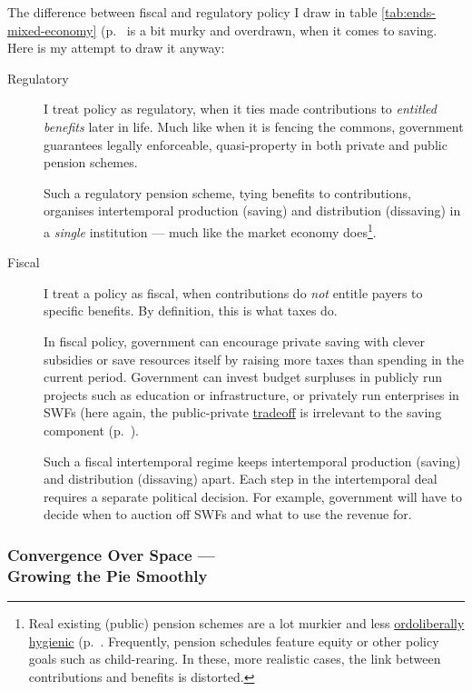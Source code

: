 The difference between fiscal and regulatory policy I draw in table \ref{tab:ends-mixed-economy} (p.~\pageref{tab:ends-mixed-economy} is a bit murky and overdrawn, when it comes to saving.  Here is my attempt to draw it anyway:
\begin{description}
	\item[Regulatory] I treat policy as regulatory, when it ties made contributions to \emph{entitled benefits} later in life. Much like when it is fencing the commons, government guarantees legally enforceable, quasi-property in both private and public pension schemes.

	Such a regulatory pension scheme, tying benefits to contributions, organises intertemporal production (saving) and distribution (dissaving) in a \emph{single} institution --- much like the market economy does\footnote{
		Real existing (public) pension schemes are a lot murkier and less \hyperref[sec:ordoliberalhygiene]{ordoliberally hygienic} (p.~\pageref{sec:ordoliberalhygiene}. Frequently, pension schedules feature equity or other policy goals such as child-rearing. In these, more realistic cases, the link between contributions and benefits is distorted.}.
	\item[Fiscal] I treat a policy as fiscal, when contributions do \emph{not} entitle payers to specific benefits. By definition, this is what taxes do.

	In fiscal policy, government can encourage private saving with clever subsidies or save resources itself by raising more taxes than spending in the current period. Government can invest budget surpluses in publicly run projects such as education or infrastructure, or privately run enterprises in \glspl{SWF} (here again, the public-private \hyperref[sec:tradeoffs]{tradeoff} is irrelevant to the saving component (p.~\pageref{tradeoffs}).

	Such a fiscal intertemporal regime keeps intertemporal production (saving) and distribution (dissaving) apart. Each step in the intertemporal deal requires a separate political decision. For example, government will have to decide when to auction off \glspl{SWF} and what to use the revenue for.
\end{description}

\subsubsection[Convergence Over Space]{Convergence Over Space ---\\Growing the Pie Smoothly} \label{sec:space}

